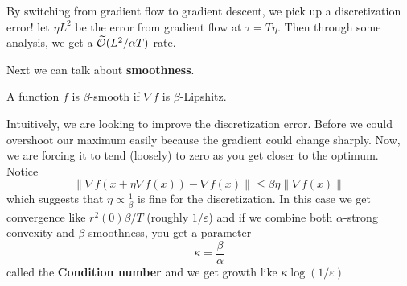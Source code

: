 \documentclass[12pt]{article}
\begin{document}
By switching from gradient flow to gradient descent, we pick up a discretization error! let $\eta L^2$ be the error from gradient flow at $\tau=T\eta$.
Then through some analysis, we get a $\widetilde{\mathcal{O}}(L^2/\alpha T)$ rate.

\brk

Next we can talk about \textbf{smoothness}.
\begin{defn}
	A function $f$ is $\beta$-smooth if $\nabla f$ is $\beta$-Lipshitz.
\end{defn}
Intuitively, we are looking to improve the discretization error. Before we could overshoot our maximum easily because the gradient could change sharply.
Now, we are forcing it to tend (loosely) to zero as you get closer to the optimum. Notice
\[\|\nabla f(x+\eta\nabla f(x))-\nabla f(x)\|\le\beta\eta\|\nabla f(x)\|\]
which suggests that $\eta\propto\frac{1}{\beta}$ is fine for the discretization. In this case we get convergence like $r^2(0)\beta/T$ (roughly $1/\varepsilon$)
and if we combine both $\alpha$-strong convexity and $\beta$-smoothness, you get a parameter 
\[\kappa=\frac{\beta}{\alpha}\]
called the \textbf{Condition number} and we get growth like $\kappa\log(1/\varepsilon)$
\end{document}
